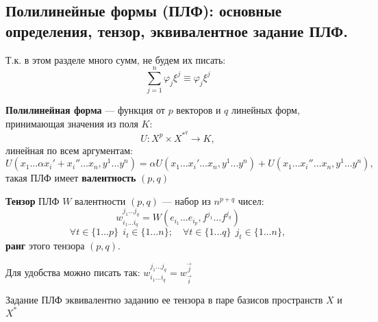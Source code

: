 \subsection{Полилинейные формы (ПЛФ): основные определения, тензор, эквивалентное задание ПЛФ.}
\begin{remark}
    Т.к. в этом разделе много сумм, не будем их писать: $$\sum\limits_{j=1}^n\varphi_j\xi^j\equiv \varphi_j\xi^j$$
\end{remark}
\begin{definition}
    \textbf{Полилинейная форма} --- функция от $p$ векторов и $q$ линейных форм, принимающая значения из поля $K$: $$U: X^p\times X^{*^{q}}\to K,$$ линейная по всем аргументам: $$U(x_1\ldots \alpha x_i'+x_i''\ldots x_n,y^1\ldots y^n)=\alpha U(x_1\ldots x_i'\ldots x_n,y^1\ldots y^n)+U(x_1\ldots x_i''\ldots x_n,y^1\ldots y^n),$$ такая ПЛФ имеет \textbf{валентность} $(p,q)$
\end{definition}
\begin{definition}
    \textbf{Тензор} ПЛФ $W$ валентности $(p,q)$ --- набор из $n^{p+q}$ чисел:
    $$w^{j_1\ldots j_q}_{i_1\ldots i_q}=W(e_{i_1}\ldots e_{i_p},f^{j_1}\ldots f^{j_q})$$
    $$\forall t\in\{1\ldots p\}\ \ i_t\in\{1\ldots n\}; \quad \forall t\in\{1\ldots q\}\ \ j_t\in\{1\ldots n\},$$ \textbf{ранг} этого тензора $(p, q)$.
\end{definition}
\begin{remark}
    Для удобства можно писать так: $w^{j_1\ldots j_q}_{i_1\ldots i_q}=w^{\vec j}_{\vec i}$
\end{remark}
\begin{theorem}
    Задание ПЛФ эквивалентно заданию ее тензора в паре базисов пространств $X$ и $X^*$
\end{theorem}
